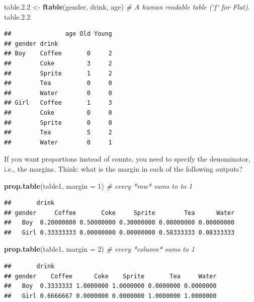 \documentclass[]{book}
\newenvironment{Shaded}{\begin{snugshade}}{\end{snugshade}}
\newcommand{\CommentTok}[1]{\textcolor[rgb]{0.56,0.35,0.01}{\textit{#1}}}
\newcommand{\DataTypeTok}[1]{\textcolor[rgb]{0.13,0.29,0.53}{#1}}
\newcommand{\DecValTok}[1]{\textcolor[rgb]{0.00,0.00,0.81}{#1}}
\newcommand{\FloatTok}[1]{\textcolor[rgb]{0.00,0.00,0.81}{#1}}
\newcommand{\KeywordTok}[1]{\textcolor[rgb]{0.13,0.29,0.53}{\textbf{#1}}}
\newcommand{\NormalTok}[1]{#1}
\newcommand{\StringTok}[1]{\textcolor[rgb]{0.31,0.60,0.02}{#1}}
\theoremstyle{definition}
\theoremstyle{definition}
\theoremstyle{definition}
\theoremstyle{remark}
\begin{document}
\begin{Shaded}
\begin{Highlighting}[]
\NormalTok{table.}\FloatTok{2.2}\NormalTok{ <-}\StringTok{ }\KeywordTok{ftable}\NormalTok{(gender, drink, age) }\CommentTok{# A human readable table (`f` for Flat).}
\NormalTok{table.}\FloatTok{2.2}
\end{Highlighting}
\end{Shaded}

\begin{verbatim}
##               age Old Young
## gender drink               
## Boy    Coffee       0     2
##        Coke         3     2
##        Sprite       1     2
##        Tea          0     0
##        Water        0     0
## Girl   Coffee       1     3
##        Coke         0     0
##        Sprite       0     0
##        Tea          5     2
##        Water        0     1
\end{verbatim}

If you want proportions instead of counts, you need to specify the denominator, i.e., the margins.
Think: what is the margin in each of the following outputs?

\begin{Shaded}
\begin{Highlighting}[]
\KeywordTok{prop.table}\NormalTok{(table1, }\DataTypeTok{margin =} \DecValTok{1}\NormalTok{) }\CommentTok{# every *row* sums to to 1}
\end{Highlighting}
\end{Shaded}

\begin{verbatim}
##       drink
## gender     Coffee       Coke     Sprite        Tea      Water
##   Boy  0.20000000 0.50000000 0.30000000 0.00000000 0.00000000
##   Girl 0.33333333 0.00000000 0.00000000 0.58333333 0.08333333
\end{verbatim}

\begin{Shaded}
\begin{Highlighting}[]
\KeywordTok{prop.table}\NormalTok{(table1, }\DataTypeTok{margin =} \DecValTok{2}\NormalTok{) }\CommentTok{# every *column* sums to 1}
\end{Highlighting}
\end{Shaded}

\begin{verbatim}
##       drink
## gender    Coffee      Coke    Sprite       Tea     Water
##   Boy  0.3333333 1.0000000 1.0000000 0.0000000 0.0000000
##   Girl 0.6666667 0.0000000 0.0000000 1.0000000 1.0000000
\end{verbatim}
\end{document}
